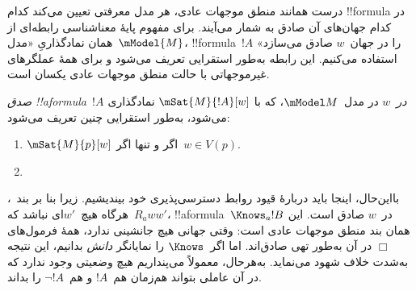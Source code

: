 \documentclass[../../../include/open-logic-section]{subfiles}
\begin{document}


درست همانند منطق موجهات عادی، هر مدل معرفتی تعیین می‌کند کدام
!!{formula} در کدام جهان‌های آن صادق به شمار می‌آیند. برای مفهوم پایهٔ
معناشناسی رابطه‌ای از همان نمادگذاریِ «مدل~$\mModel{M}$،
!!{formula}~$!A$ را در جهان~$w$ صادق می‌سازد» استفاده می‌کنیم. این رابطه
به‌طور استقرایی تعریف می‌شود و برای همهٔ عملگرهای غیرموجهاتی با حالت
منطق موجهات عادی یکسان است.

\begin{defn}
  \emph{صدق !!a{formula}~$!A$ در~$w$} در مدل~$\mModel M$، که با
  $\mSat{M}{!A}[w]$ نمادگذاری می‌شود، به‌طور استقرایی چنین تعریف می‌شود:
  \begin{enumerate}
  \item $\mSat{M}{p}[w]$ اگر و تنها اگر~$w \in V(p)$.
  \item{}
  \end{enumerate}
\end{defn}

بااین‌حال، اینجا باید دربارهٔ قیود روابط دسترسی‌پذیری خود بیندیشیم.
زیرا بنا بر بند~، هرگاه هیچ~$w'$ای نباشد
که~$R_a ww'$، !!a{formula}~$\Knows_a !B$ در~$w$ صادق است. این همان بند
منطق موجهات عادی است: وقتی جهانی هیچ جانشینی ندارد، همهٔ فرمول‌های
$\Box$ در آن به‌طور تهی صادق‌اند. اما اگر~$\Knows$ را نمایانگر
\emph{دانش} بدانیم، این نتیجه به‌شدت خلاف شهود می‌نماید. به‌هرحال، معمولاً
می‌پنداریم هیچ وضعیتی وجود ندارد که در آن عاملی بتواند هم‌زمان هم~$!A$
و هم~$\lnot !A$ را بداند.
\end{document}
